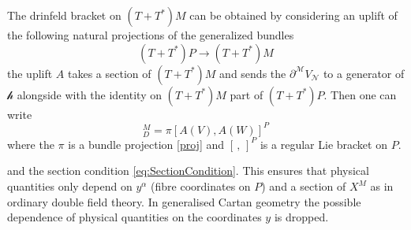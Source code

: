\documentclass[11pt,a4paper]{article}
\numberwithin{equation}{section}
\begin{document}
The drinfeld bracket on $(T+T^*)M$ can be obtained by considering an uplift of the following natural projections of the generalized bundles 
\begin{equation} \label{proj}
     (T+T^*) P \rightarrow (T+T^*)M
\end{equation}
the uplift $A$ takes a section of $(T+T^*)M$ and sends the $\partial^{\mathcal{M}} V_{\mathcal{N}}$ to a generator of $\mathcal{h}$ alongside with the identity on $(T+T^*)M$ part of $(T+T^*)P$. Then one can write 
\begin{equation}
    [V,W]_D^M = \pi [A(V),A(W)]^P
\end{equation}
where the $\pi$ is a bundle projection \eqref{proj} and $[\, ,\,]^P$ is a regular Lie bracket on $P$.

and the section condition \eqref{eq:SectionCondition}. This ensures that physical quantities only depend on $y^\alpha$ (fibre coordinates on $P$) and a section of $X^M$ as in ordinary double field theory. In generalised Cartan geometry the possible dependence of physical quantities on the coordinates $y$ is dropped. 
\end{document}
